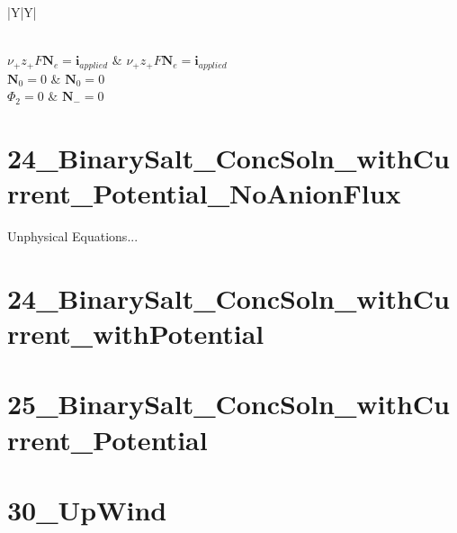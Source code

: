 \documentclass[12pt]{article}
\newcommand{\flux}{\mathrm{\mathbf{N}}}
\newcommand{\solcur}{\mathrm{\mathbf{i}}}
\begin{document}
\begin{table}[h]
\begin{tabularx}{\textwidth}{|Y|Y|}
				 \\

				\hline
				 \\
				\hline

				\(\displaystyle \nu_+ z_+ F \flux_e = \solcur_{applied} \) 	&  \(\displaystyle \nu_+ z_+ F \flux_e = \solcur_{applied} \) \\
				\(\displaystyle \flux_0 = 0 \) 								&  \(\displaystyle \flux_0 = 0 \) \\
				\(\displaystyle \Phi_2 = 0 \) 								&  \(\displaystyle \flux_- = 0 \) \\

				\hline

			\end{tabularx}
		\end{table}

	\clearpage
	\section*{24\_BinarySalt\_ConcSoln\_withCurrent\_Potential\_NoAnionFlux}
	Unphysical Equations...

	\clearpage
	\section*{24\_BinarySalt\_ConcSoln\_withCurrent\_withPotential}
	

	\clearpage
	\section*{25\_BinarySalt\_ConcSoln\_withCurrent\_Potential}


	\clearpage
	\section*{30\_UpWind}

	\clearpage 
\end{document}
